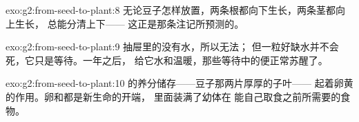 \begin{solution}{exo:g2:from-seed-to-plant:8}
无论豆子怎样放置，两条根都向下生长，两条茎都向上生长，
总能分清上下——
这正是那条注记所预测的。
\end{solution}

\begin{solution}{exo:g2:from-seed-to-plant:9}
抽屉里的没有水，所以无法；
但一粒好缺水并不会死，它只是等待。一年之后，
给它水和温暖，那些等待中的便正常苏醒了。
\end{solution}

\begin{solution}{exo:g2:from-seed-to-plant:10}
的养分储存——豆子那两片厚厚的子叶——
起着卵黄的作用。卵和都是新生命的开端，
里面装满了幼体在
能自己取食之前所需要的食物。
\end{solution}
